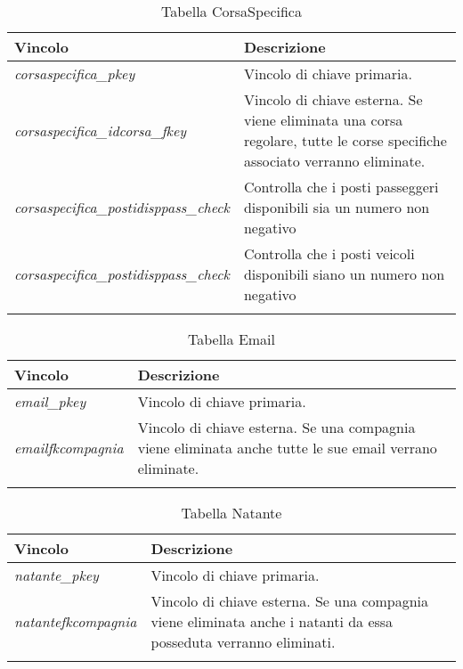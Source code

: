 \begin{longtable}{|| m{} | m{} ||}
    \hline\hline
     \textbf{Vincolo} & \textbf{Descrizione} \\ [1ex]
     \hline\hline
     \endfirsthead

      \textit{corsaspecifica\_pkey} & Vincolo di chiave primaria. \\ [1ex]
      \hline

      \textit{corsaspecifica\_idcorsa\_fkey} & Vincolo di chiave esterna. Se viene eliminata una corsa regolare, tutte le corse specifiche associato verranno eliminate. \\ [1ex]
      \hline
        
      \textit{corsaspecifica\_postidisppass\_check} & Controlla che i posti passeggeri disponibili sia un numero non negativo \\ [1ex]
     \hline

     \textit{corsaspecifica\_postidisppass\_check} & Controlla che i posti veicoli disponibili siano un numero non negativo \\ [1ex]      
     \hline\hline

     \caption*{Tabella CorsaSpecifica} \\
\end{longtable}
\newpage

\begin{longtable}{|| m{} | m{} ||}
    \hline\hline
     \textbf{Vincolo} & \textbf{Descrizione} \\ [1ex]
     \hline\hline
     \endfirsthead

      \textit{email\_pkey} & Vincolo di chiave primaria. \\ [1ex]
      \hline

      \textit{emailfkcompagnia} & Vincolo di chiave esterna. Se una compagnia viene eliminata anche tutte le sue email verrano eliminate. \\ [1ex]      
     \hline\hline

     \caption*{Tabella Email} \\
\end{longtable}

\begin{longtable}{|| m{} | m{} ||}
    \hline\hline
     \textbf{Vincolo} & \textbf{Descrizione} \\ [1ex]
     \hline\hline
     \endfirsthead

      \textit{natante\_pkey} & Vincolo di chiave primaria. \\ [1ex]
      \hline

      \textit{natantefkcompagnia} & Vincolo di chiave esterna. Se una compagnia viene eliminata anche i natanti da essa posseduta verranno eliminati. \\ [1ex]      
     \hline\hline

     \caption*{Tabella Natante} \\
\end{longtable}


